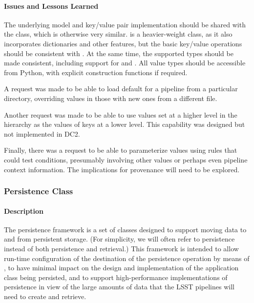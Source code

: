 \paragraph{Issues and Lessons Learned}

The underlying model and key/value pair implementation should be shared
with the  class, which is otherwise very similar.
 is
a heavier-weight class, as it also incorporates dictionaries and other
features, but the basic key/value operations should be consistent with
.  At the same time, the supported types should be made
consistent, including support for  and .  All
value types should be accessible from Python, with explicit construction
functions if required.

A request was made to be able to load default  for a pipeline
from a particular directory, overriding values in those  with
new ones from a different  file.

Another request was made to be able to use values set at a higher
level in the  hierarchy as the values of keys at a lower level.
This capability was designed but not implemented in DC2.

Finally, there was a request to be able to parameterize  values
using rules that could test conditions, presumably involving other
values or perhaps even pipeline context information.  The implications
for provenance will need to be explored.

\subsubsection{Persistence Class}
\label{persistence}

\paragraph{Description}

The persistence framework is a set of classes designed to support moving
data to and from persistent storage.  (For simplicity, we will often
refer to persistence instead of both persistence and retrieval.)  This
framework is intended to allow run-time configuration of the destination
of the persistence operation by means of , to have minimal impact
on the design and implementation of the application class being
persisted, and to support high-performance implementations of
persistence in view of the large amounts of data that the LSST pipelines
will need to create and retrieve.

